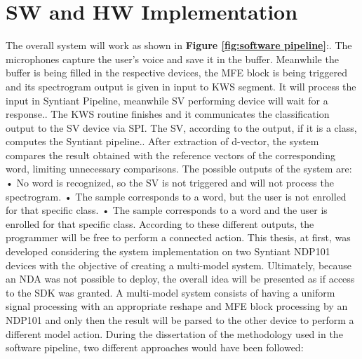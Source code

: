 \chapter{SW and HW Implementation}
\label{cha:software and hardware implementation}
The overall system will work as shown in \textbf{Figure \ref{fig:software pipeline}}:. The microphones capture the user's voice and save it in the buffer. Meanwhile the buffer is being filled in the respective devices, the MFE block is being triggered and its spectrogram output is given in input to KWS segment. It will process the input in Syntiant Pipeline, meanwhile SV performing device will wait for a response.. The KWS routine finishes and it communicates the classification output to the SV device via SPI. The SV, according to the output, if it is a class, computes the Syntiant pipeline.. After extraction of d-vector, the system compares the result obtained with the reference vectors of the corresponding word, limiting unnecessary comparisons.\newline\newline
The possible outputs of the system are:\newline
• No word is recognized, so the SV is not triggered and will not process the spectrogram.\newline
• The sample corresponds to a word, but the user is not enrolled for that specific class.\newline
• The sample corresponds to a word and the user is enrolled for that specific class.\newline
According to these different outputs, the programmer will be free to perform a connected action.\newline
This thesis, at first, was developed considering the system implementation on two Syntiant NDP101 devices with the objective of creating a multi-model system. Ultimately, because an NDA was not possible to deploy, the overall idea will be presented as if access to the SDK was granted.
A multi-model system consists of having a uniform signal processing with an appropriate reshape and MFE block processing by an NDP101 and only then the result will be parsed to the other device to perform a different model action.
During the dissertation of the methodology used in the software pipeline, two different approaches would have been followed:\newline\newline
